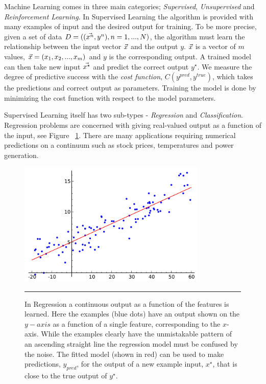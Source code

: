 Machine Learning comes in three main categories; \textit{Supervised}, \textit{Unsupervised} and \textit{Reinforcement Learning}.
In Supervised Learning the algorithm is provided with many examples of input and the desired output for training.
To be more precise, given a set of data $D = ((\vo{x^n}, y^n), n = 1, ..., N )$, the algorithm must learn the relationship between the input vector $\vo{x}$ and the output $y$.
$\vo{x}$ is a vector of $m$ values, $\vo{x} = (x_1, x_2, ..., x_m)$ and $y$ is the corresponding output\citep{domingos2012few}.
A trained model can then take new input $\vo{x^\star }$ and predict the correct output $y^\star$.
We measure the degree of predictive success with the \textit{cost function}, $C(y^{pred}, y^{true})$, which takes the predictions and correct output as parameters.
Training the model is done by minimizing the cost function with respect to the model parameters.

Supervised Learning itself has two sub-types - \textit{Regression} and \textit{Classification}.
Regression problems are concerned with giving real-valued output as a function of the input\citep{sammut2011encyclopedia}, see Figure ~\ref{fig:regression}.
There are many applications requiring numerical predictions on a continuum such as stock prices, temperatures and power generation.
\begin{figure}[htbp]
	\centering
		\includegraphics[width = 0.8\textwidth]{./Figures/regression.png}
		\rule{35em}{0.5pt}
	\caption[Regression]{In Regression a continuous output as a function of the features is learned. Here the examples (blue dots) have an output shown on the $y-axis $ as a function of a single feature, corresponding to the $x$-axis. While the examples clearly have the unmistakable pattern of an ascending straight line the regression model must be confused by the noise. The fitted model (shown in red) can be used to make predictions, $y_{pred} $, for the output of a new example input, $x^\star $, that is close to the true output of $y^\star $.}
		\label{fig:regression}
\end{figure}

